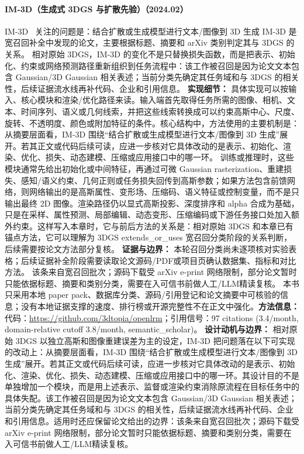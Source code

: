 \paragraph{IM-3D（生成式 3DGS 与扩散先验）（2024.02）}
IM-3D~\cite{2402_08682} 关注的问题是：结合扩散或生成模型进行文本/图像到 3D 生成 IM-3D 是宽召回补全中发现的论文，主要根据标题、摘要和 arXiv 类别判定其与 3DGS 的关系。
相对原始 3DGS，IM-3D 的变化不是只替换损失函数，而是把表示、初始化、约束或网络预测路径重新组织到任务流程中：该工作被召回是因为论文文本包含 Gaussian/3D Gaussian 相关表述；当前分类先确定其任务域和与 3DGS 的相关性，后续证据流水线再补代码、企业和引用信息。
\textbf{实现细节：} 具体实现可以按输入、核心模块和渲染/优化路径来读。输入端首先取得任务所需的图像、相机、文本、时间序列、语义或几何线索，并把这些线索转换成可以约束高斯中心、尺度、旋转、不透明度、颜色或附加特征的条件。核心结构中，方法使用的主要机制是：从摘要层面看，IM-3D 围绕“结合扩散或生成模型进行文本/图像到 3D 生成”展开。若其正文或代码后续可读，应进一步核对它具体改动的是表示、初始化、渲染、优化、损失、动态建模、压缩或应用接口中的哪一环。 训练或推理时，这些模块通常先给出初始化或中间特征，再通过可微 Gaussian rasterization、重建损失、感知/语义约束、几何正则或任务损失回传到高斯参数；如果方法包含前馈网络，则网络输出的是高斯属性、变形场、压缩码、语义特征或控制变量，而不是只输出最终 2D 图像。渲染路径仍以显式高斯投影、深度排序和 alpha 合成为基础，只是在采样、属性预测、局部编辑、动态变形、压缩编码或下游任务接口处加入额外约束。这样写入本章时，它与前后方法的关系是：相对原始 3DGS 和本章已有锚点方法，它可以理解为 3DGS extends\_or\_uses 宽召回分类阶段的关系判断，后续需要按论文方法部分复核。
\textbf{证据与边界：} 本轮召回分类尚未逐项核对实验表格；后续证据补全阶段需要读取论文源码/PDF或项目页确认数据集、指标和对比方法。 该条来自宽召回批次；源码下载受 arXiv e-print 网络限制，部分论文暂时只能依据标题、摘要和类别分类，需要在入可信书前做人工/LLM精读复核。 本书只采用本地 paper pack、数据库分类、源码/引用登记和论文摘要中可核验的信息；没有本地证据支撑的速度、排行榜或开源完整性不在正文中强化。\textbf{方法信息：} 代码：\url{https://github.com/3dtopia/openlrm}；引用信号：97 citations (3.4/month, domain-relative cutoff 3.8/month, semantic\_scholar)。
\textbf{设计动机与边界：} 相对原始 3DGS 以独立高斯和图像重建误差为主的设定，IM-3D 把问题落在以下可实现的改动上：从摘要层面看，IM-3D 围绕“结合扩散或生成模型进行文本/图像到 3D 生成”展开。若其正文或代码后续可读，应进一步核对它具体改动的是表示、初始化、渲染、优化、损失、动态建模、压缩或应用接口中的哪一环。其设计目的不是单独增加一个模块，而是用上述表示、监督或渲染约束消除原流程在目标任务中的具体失配。该工作被召回是因为论文文本包含 Gaussian/3D Gaussian 相关表述；当前分类先确定其任务域和与 3DGS 的相关性，后续证据流水线再补代码、企业和引用信息。适用时还应保留论文给出的边界：该条来自宽召回批次；源码下载受 arXiv e-print 网络限制，部分论文暂时只能依据标题、摘要和类别分类，需要在入可信书前做人工/LLM精读复核。
